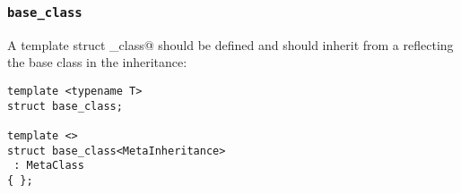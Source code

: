 \subsubsection{\texttt{base\_class}}

A template struct \verb@base_class@ should be defined and should inherit from
a  reflecting the base class in the inheritance:

\begin{verbatim}
template <typename T>
struct base_class;

template <>
struct base_class<MetaInheritance>
 : MetaClass
{ };
\end{verbatim}

